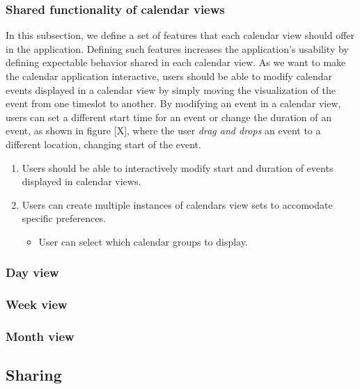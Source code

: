 \subsubsection*{Shared functionality of calendar views}
In this subsection, we define a set of features that each calendar view should offer in the application. Defining such features increases the application's usability by defining expectable behavior shared in each calendar view.
As we want to make the calendar application interactive, users should be able to modify calendar events displayed in a calendar view by simply moving the visualization of the event from one timeslot to another. By modifying an event in a calendar view, users can set a different start time for an event or change the duration of an event, as shown in figure [X], where the user \textit{drag and drops} an event to a different location, changing start of the event.

\begin{enumerate}[label=\color{reqcolor}\textbf{R{\arabic*}}, resume]
    \item \label{app:req:views1} Users should be able to interactively modify start and duration of events displayed in calendar views.
    \item \label{app:req:views2} Users can create multiple instances of calendars view sets to accomodate specific preferences.
        \begin{itemize}
            \item User can select which calendar groups to display.
        \end{itemize}
\end{enumerate}

\subsubsection*{Day view}

\subsubsection*{Week view}

\subsubsection*{Month view}

\subsection*{Sharing}

